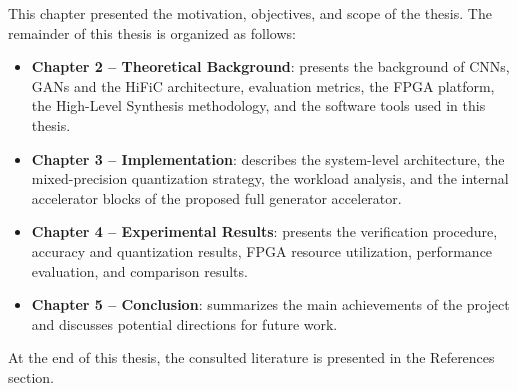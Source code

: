 This chapter presented the motivation, objectives, and scope of the thesis. The remainder of this thesis is organized as follows:
\begin{itemize}
    \item \textbf{Chapter 2 -- Theoretical Background}: presents the background of CNNs, GANs and the HiFiC architecture, evaluation metrics, the FPGA platform, the High-Level Synthesis methodology, and the software tools used in this thesis.
    \item \textbf{Chapter 3 -- Implementation}: describes the system-level architecture, the mixed-precision quantization strategy, the workload analysis, and the internal accelerator blocks of the proposed full generator accelerator.
    \item \textbf{Chapter 4 -- Experimental Results}: presents the verification procedure, accuracy and quantization results, FPGA resource utilization, performance evaluation, and comparison results.
    \item \textbf{Chapter 5 -- Conclusion}: summarizes the main achievements of the project and discusses potential directions for future work.
\end{itemize}
At the end of this thesis, the consulted literature is presented in the References section.
